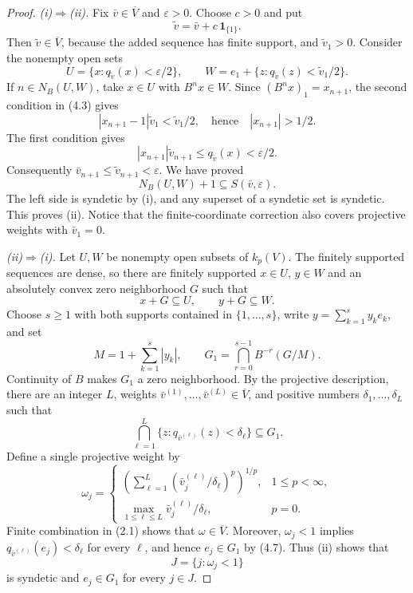 \documentclass[11pt]{article}
\theoremstyle{remark}
\newcommand{\cV}{\overline V}
\newcommand{\kp}{k_p(V)}
\begin{document}
\begin{proof}
\emph{(i)$\Rightarrow$(ii).}
Fix $\bar v\in\cV$ and $\varepsilon>0$.  Choose $c>0$ and put
\[
 \widetilde v=\bar v+c\,\mathbf1_{\{1\}}.
\]
Then $\widetilde v\in\cV$, because the added sequence has finite support,
and $\widetilde v_1>0$.  Consider the nonempty open sets
\[
 U=\{x:q_{\widetilde v}(x)<\varepsilon/2\},\qquad
 W=e_1+\{z:q_{\widetilde v}(z)<\widetilde v_1/2\}.
 \tag{4.3}
\]
If $n\in N_B(U,W)$, take $x\in U$ with $B^nx\in W$.  Since
$(B^nx)_1=x_{n+1}$, the second condition in (4.3) gives
\[
 |x_{n+1}-1|\widetilde v_1<\widetilde v_1/2,
 \quad\text{hence}\quad |x_{n+1}|>1/2.
\]
The first condition gives
\[
 |x_{n+1}|\widetilde v_{n+1}\leq q_{\widetilde v}(x)
 <\varepsilon/2.
\]
Consequently $\bar v_{n+1}\leq\widetilde v_{n+1}<\varepsilon$.  We have
proved
\[
 N_B(U,W)+1\subseteq S(\bar v,\varepsilon).
 \tag{4.4}
\]
The left side is syndetic by (i), and any superset of a syndetic set is
syndetic.  This proves (ii).  Notice that the finite-coordinate correction
also covers projective weights with $\bar v_1=0$.

\emph{(ii)$\Rightarrow$(i).}
Let $U,W$ be nonempty open subsets of $\kp$.  The finitely supported
sequences are dense, so there are finitely supported $x\in U$, $y\in W$ and
an absolutely convex zero neighborhood $G$ such that
\[
 x+G\subseteq U,\qquad y+G\subseteq W.
 \tag{4.5}
\]
Choose $s\geq1$ with both supports contained in $\{1,\ldots,s\}$, write
$y=\sum_{k=1}^s y_ke_k$, and set
\[
 M=1+\sum_{k=1}^s|y_k|,
 \qquad
 G_1=\bigcap_{r=0}^{s-1}B^{-r}(G/M).
 \tag{4.6}
\]
Continuity of $B$ makes $G_1$ a zero neighborhood.  By the projective
description, there are an integer $L$, weights
$\bar v^{(1)},\ldots,\bar v^{(L)}\in\cV$, and positive numbers
$\delta_1,\ldots,\delta_L$ such that
\[
 \bigcap_{\ell=1}^L\{z:q_{\bar v^{(\ell)}}(z)<\delta_\ell\}
 \subseteq G_1.
 \tag{4.7}
\]
Define a single projective weight by
\[
 \omega_j=
 \begin{cases}
 \left(\displaystyle\sum_{\ell=1}^L
 (\bar v^{(\ell)}_j/\delta_\ell)^p\right)^{1/p},&1\leq p<\infty,\\[3mm]
 \displaystyle\max_{1\leq\ell\leq L}
 \bar v^{(\ell)}_j/\delta_\ell,&p=0.
 \end{cases}
 \tag{4.8}
\]
Finite combination in (2.1) shows that $\omega\in\cV$.  Moreover,
$\omega_j<1$ implies $q_{\bar v^{(\ell)}}(e_j)<\delta_\ell$ for every
$\ell$, and hence $e_j\in G_1$ by (4.7).  Thus (ii) shows that
\[
 J=\{j:\omega_j<1\}
 \tag{4.9}
\]
is syndetic and $e_j\in G_1$ for every $j\in J$.


\end{proof}
\end{document}
